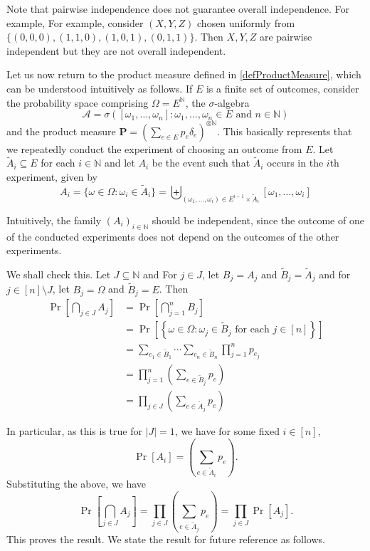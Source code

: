 Note that pairwise independence does not guarantee overall independence. For example, For example, consider $(X,Y,Z)$ chosen uniformly from $\{(0,0,0),(1,1,0),(1,0,1),(0,1,1)\}$. Then $X,Y,Z$ are pairwise independent but they are not overall independent.

\vspace{2mm}
Let us now return to the product measure defined in \cref{defProductMeasure}, which can be understood intuitively as follows. If $E$ is a finite set of outcomes, consider the probability space comprising $\Omega=E^\mathbb{N}$, the $\sigma$-algebra
$$\mathcal{A}=\sigma([\omega_1,\ldots,\omega_n]:\omega_1,\ldots,\omega_n\in E\text{ and }n\in\mathbb{N})$$
and the product measure $\textbf{P}=\left(\sum_{e\in E}p_e\delta_e\right)^{\otimes\mathbb{N}}$. This basically represents that we repeatedly conduct the experiment of choosing an outcome from $E$. Let $\tilde A_i\subseteq E$ for each $i\in\mathbb{N}$ and let $A_i$ be the event such that $\tilde A_i$ occurs in the $i$th experiment, given by
$$A_i = \{\omega\in\Omega:\omega_i\in\tilde A_i\}
  =\biguplus_{(\omega_1,\ldots,\omega_i)\in E^{i-1}\times \tilde A_i} [\omega_1,\ldots,\omega_i]$$

Intuitively, the family $(A_i)_{i\in\mathbb{N}}$ should be independent, since the outcome of one of the conducted experiments does not depend on the outcomes of the other experiments.

We shall check this. Let $J\subseteq\mathbb{N}$ and For $j\in J$, let $B_j=A_j$ and $\tilde B_j=\tilde A_j$ and for $j\in[n]\setminus J$, let $B_j=\Omega$ and $\tilde B_j=E$. Then
\begin{align*}
    \Pr\left[\bigcap_{j\in J}A_j\right] &= \Pr\left[\bigcap_{j=1}^n B_j\right] \\
    &= \Pr\left[\left\{\omega\in\Omega:\omega_j\in\tilde B_j\text{ for each }j\in[n]\right\}\right] \\
    &= \sum_{e_1\in\tilde B_1} \cdots \sum_{e_n\in\tilde B_n} \prod_{j=1}^n p_{e_j} \\
    &= \prod_{j=1}^n \left(\sum_{e\in\tilde B_j}p_e\right) \\
    &= \prod_{j\in J} \left(\sum_{e\in\tilde A_j}p_e\right)
\end{align*}

In particular, as this is true for $|J|=1$, we have for some fixed $i\in[n]$,
$$\Pr[A_i] = \left(\sum_{e\in\tilde A_i}p_e\right).$$
Substituting the above, we have
$$
\Pr\left[\bigcap_{j\in J}A_j\right] 
= \prod_{j\in J} \left(\sum_{e\in\tilde A_j}p_e\right)
= \prod_{j\in J} \Pr[A_j].
$$
This proves the result. We state the result for future reference as follows.

